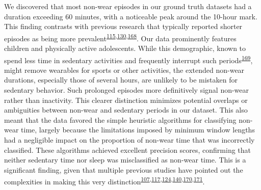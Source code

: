 \documentclass[
  10pt,
]{scrbook}
\begin{document}
We discovered that most non-wear episodes in our ground truth datasets
had a duration exceeding 60 minutes, with a noticeable peak around the
10-hour mark. This finding contrasts with previous research that
typically reported shorter episodes as being more
prevalent\textsuperscript{\protect\hyperlink{ref-aadland_comparison_2018}{115},\protect\hyperlink{ref-jaeschke_variability_2018}{130},\protect\hyperlink{ref-hutto_identifying_2013}{168}}.
Our data prominently features children and physically active
adolescents. While this demographic, known to spend less time in
sedentary activities and frequently interrupt such
periods\textsuperscript{\protect\hyperlink{ref-cooper_objectively_2015}{169}},
might remove wearables for sports or other activities, the extended
non-wear durations, especially those of several hours, are unlikely to
be mistaken for sedentary behavior. Such prolonged episodes more
definitively signal non-wear rather than inactivity. This clearer
distinction minimizes potential overlaps or ambiguities between non-wear
and sedentary periods in our dataset. This also meant that the data
favored the simple heuristic algorithms for classifying non-wear time,
largely because the limitations imposed by minimum window lengths had a
negligible impact on the proportion of non-wear time that was
incorrectly classified. These algorithms achieved excellent precision
scores, confirming that neither sedentary time nor sleep was
misclassified as non-wear time. This is a significant finding, given
that multiple previous studies have pointed out the complexities in
making this very
distinction\textsuperscript{\protect\hyperlink{ref-choi_validation_2011}{107},\protect\hyperlink{ref-duncan_wear-time_2018}{117},\protect\hyperlink{ref-doherty_large_2017}{124},\protect\hyperlink{ref-troiano_physical_2008}{140},\protect\hyperlink{ref-barouni_ambulatory_2020}{170},\protect\hyperlink{ref-mn_non-wear_2020}{171}}.
\end{document}
